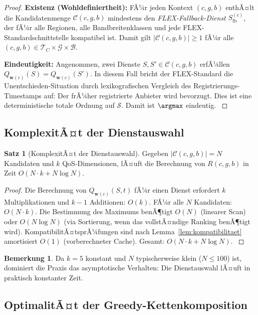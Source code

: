 ﻿\documentclass[a4paper,12pt]{article}
\theoremstyle{definition}
\newtheorem{satz}{Satz}
\newtheorem{bemerkung}{Bemerkung}
\begin{document}
\begin{proof}
\textbf{Existenz (Wohldefiniertheit):} FÃ¼r jeden Kontext $(c, g, b)$ enthÃ¤lt die Kandidatenmenge $\mathcal{C}(c, g, b)$ mindestens den \emph{FLEX-Fallback-Dienst} $S_\mathrm{fb}^{(c)}$, der fÃ¼r alle Regionen, alle Bandbreitenklassen und jede FLEX-Standardschnittstelle kompatibel ist. Damit gilt $|\mathcal{C}(c,g,b)| \geq 1$ fÃ¼r alle $(c,g,b) \in \mathcal{T}_C \times \mathcal{G} \times \mathcal{B}$.

\textbf{Eindeutigkeit:} Angenommen, zwei Dienste $S, S' \in \mathcal{C}(c,g,b)$ erfÃ¼llen $Q_{\mathbf{w}(c)}(S) = Q_{\mathbf{w}(c)}(S')$. In diesem Fall bricht der FLEX-Standard die Unentschieden-Situation durch lexikografischen Vergleich des Registrierungs-Timestamps auf: Der frÃ¼her registrierte Anbieter wird bevorzugt. Dies ist eine deterministische totale Ordnung auf $\mathcal{S}$. Damit ist $\argmax$ eindeutig. $
$
\end{proof}

\subsection{KomplexitÃ¤t der Dienstauswahl}

\begin{satz}[KomplexitÃ¤t der Dienstauswahl]
\label{satz:komplexitaet_routing}
Gegeben $|\mathcal{C}(c,g,b)| = N$ Kandidaten und $k$ QoS-Dimensionen, lÃ¤uft die Berechnung von $R(c,g,b)$ in Zeit $O(N \cdot k + N \log N)$.
\end{satz}

\begin{proof}
Die Berechnung von $Q_{\mathbf{w}(c)}(S, t)$ fÃ¼r einen Dienst erfordert $k$ Multiplikationen und $k-1$ Additionen: $O(k)$. FÃ¼r alle $N$ Kandidaten: $O(N \cdot k)$. Die Bestimmung des Maximums benÃ¶tigt $O(N)$ (linearer Scan) oder $O(N \log N)$ (via Sortierung, wenn das vollstÃ¤ndige Ranking benÃ¶tigt wird). KompatibilitÃ¤tsprÃ¼fungen sind nach Lemma~\ref{lem:kompatibilitaet} amortisiert $O(1)$ (vorberechneter Cache). Gesamt: $O(N \cdot k + N \log N)$. $
$
\end{proof}

\begin{bemerkung}
Da $k = 5$ konstant und $N$ typischerweise klein ($N \leq 100$) ist, dominiert die Praxis das asymptotische Verhalten: Die Dienstauswahl lÃ¤uft in praktisch konstanter Zeit.
\end{bemerkung}

\subsection{OptimalitÃ¤t der Greedy-Kettenkomposition}
\end{document}
